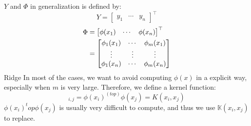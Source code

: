 $Y$ and $\Phi$ in generalization is defined by:
\begin{equation}
    Y=\begin{bmatrix}
         y_1&\cdots&y_n
      \end{bmatrix}^\top 
\end{equation}
\begin{align}
    \Phi&=\begin{bmatrix}
           \phi(x_1)&\cdots&\phi(x_n) 
          \end{bmatrix}^\top \notag\\
        &=\begin{bmatrix}
           \phi_1(x_1)&\cdots&\phi_m(x_1)\\
           \vdots&\vdots&\vdots \\
           \phi_1(x_n)&\cdots&\phi_m(x_n)
          \end{bmatrix}
\end{align}
Ridge
In most of the cases, we want to avoid computing $\phi(x)$ in a explicit way, especially when $m$ is very large. Therefore, we define a kernel function:
\begin{equation}
    [\Phi\Phi^(top)]_{i,j}=\phi(x_i)^(top) \phi(x_j)=K(x_i,x_j)
\end{equation}
$\phi(x_i)^top\phi(x_j)$ is usually very difficult to compute, and thus we use $\mathbb{K}(x_i,x_j)$ to replace. \\

